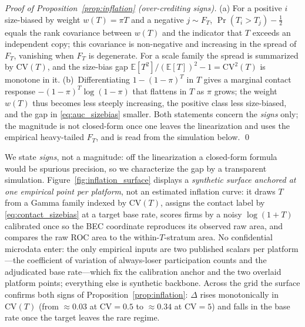 \medskip\noindent\textit{Proof of Proposition~\ref{prop:inflation} (over-crediting signs).}
(a) For a positive $i$ size-biased by weight $w(T)=\pi T$ and a
negative $j\sim F_T$, $\Pr(T_i>T_j)-\tfrac12$ equals the rank
covariance between $w(T)$ and the indicator that $T$ exceeds an
independent copy; this covariance is non-negative and increasing in
the spread of $F_T$, vanishing when $F_T$ is degenerate. For a scale
family the spread is summarized by $\mathrm{CV}(T)$, and the size-bias
gap $\mathbb{E}[T^2]/(\mathbb{E}[T])^2-1=\mathrm{CV}^2(T)$ is monotone
in it. (b)~Differentiating $1-(1-\pi)^T$ in $T$ gives a marginal
contact response $-(1-\pi)^T\log(1-\pi)$ that flattens in $T$ as $\pi$
grows; the weight $w(T)$ thus becomes less steeply increasing, the
positive class less size-biased, and the gap in
\eqref{eq:auc_sizebias} smaller. Both statements concern the
\emph{signs} only; the magnitude is not closed-form once one leaves
the linearization and uses the empirical heavy-tailed $F_T$, and is
read from the simulation below. \qed

We state \emph{signs}, not a magnitude: off the linearization a closed-form
formula would be spurious precision, so we characterize the gap by a
transparent simulation. Figure~\ref{fig:inflation_surface} displays a
\emph{synthetic surface anchored at one empirical point per platform}, not
an estimated
inflation curve: it draws $T$ from a Gamma family indexed by
$\mathrm{CV}(T)$, assigns the contact label by \eqref{eq:contact_sizebias}
at a target base rate, scores firms by a noisy $\log(1{+}T)$ calibrated
once so the BEC coordinate reproduces its observed raw area, and compares
the raw ROC area to the within-$T$-stratum area. No confidential microdata
enter: the only empirical inputs are two published scalars per
platform---the coefficient of variation of always-loser participation
counts and the adjudicated base rate---which fix the calibration anchor
and the two overlaid platform points; everything else is synthetic
backbone. Across the grid the surface confirms both signs of
Proposition~\ref{prop:inflation}: $\Delta$ rises monotonically in
$\mathrm{CV}(T)$ (from $\approx 0.03$ at $\mathrm{CV}=0.5$ to
$\approx 0.34$ at $\mathrm{CV}=5$) and falls in the base rate once the
target leaves the rare regime.

